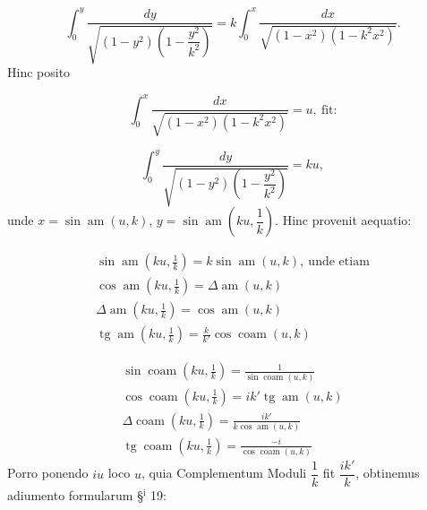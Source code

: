 \documentclass{article}
\begin{document}
\[
\int_{0}^{y}\frac{dy}{\sqrt{(1-y^{2})\left(1-\dfrac{y^{2}}{k^{2}}\right)}}=k\int_{0}^{x}\frac{dx}{\sqrt{(1-x^{2})(1-k^{2}x^{2})}}.
\]
Hinc posito

\[
\int_{0}^{x}\frac{dx}{\sqrt{(1-x^{2})(1-k^{2}x^{2})}}=u,\ \text{fit:}
\]

\[
\int_{0}^{y}\frac{dy}{\sqrt{(1-y^{2})\left(1-\dfrac{y^{2}}{k^{2}}\right)}}=ku,
\]
unde $x=\sin\operatorname{am}(u,k)$, $y=\sin\operatorname{am}\left(ku,\dfrac{1}{k}\right)$. Hinc provenit aequatio:

\[
\begin{gathered}
\sin\operatorname{am}\left(ku,\frac{1}{k}\right)=k\sin\operatorname{am}(u,k),\ \text{unde etiam}\\[1.5ex]
\cos\operatorname{am}\left(ku,\frac{1}{k}\right)=\Delta\operatorname{am}(u,k)\\[1.5ex]
\Delta\operatorname{am}\left(ku,\frac{1}{k}\right)=\cos\operatorname{am}(u,k)\\[1.5ex]
\operatorname{tg}\operatorname{am}\left(ku,\frac{1}{k}\right)=\frac{k}{k'}\cos\operatorname{coam}(u,k)
\end{gathered}
\]

\[
\begin{gathered}
\sin\operatorname{coam}\left(ku,\frac{1}{k}\right)=\frac{1}{\sin\operatorname{coam}(u,k)}\\[1.5ex]
\cos\operatorname{coam}\left(ku,\frac{1}{k}\right)=ik'\operatorname{tg}\operatorname{am}(u,k)\\[1.5ex]
\Delta\operatorname{coam}\left(ku,\frac{1}{k}\right)=\frac{ik'}{k\cos\operatorname{am}(u,k)}\\[1.5ex]
\operatorname{tg}\operatorname{coam}\left(ku,\frac{1}{k}\right)=\frac{-i}{\cos\operatorname{coam}(u,k)}
\end{gathered}
\]
Porro ponendo $iu$ loco $u$, quia Complementum Moduli $\dfrac{1}{k}$ fit $\dfrac{ik'}{k}$, obtinemus adiumento formularum §$^{\mathrm{i}}$ 19:
\end{document}
